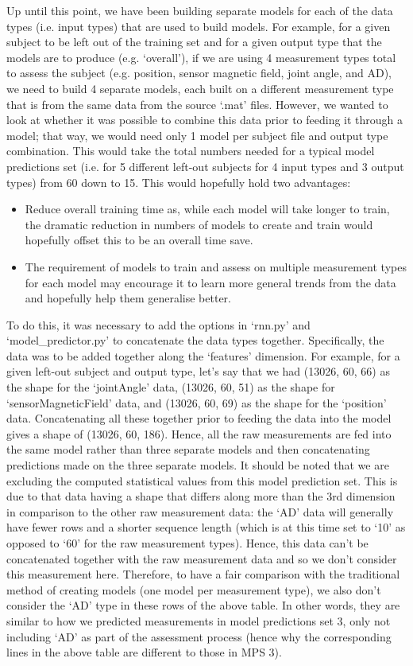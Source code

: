 \documentclass[12pt,twoside]{report}
\begin{document}
\quad Up until this point, we have been building separate models for each of the data types (i.e. input types) that are used to build models. For example, for a given subject to be left out of the training set and for a given output type that the models are to produce (e.g. ‘overall’), if we are using 4 measurement types total to assess the subject (e.g. position, sensor magnetic field, joint angle, and AD), we need to build 4 separate models, each built on a different measurement type that is from the same data from the source ‘.mat’ files. However, we wanted to look at whether it was possible to combine this data prior to feeding it through a model; that way, we would need only 1 model per subject file and output type combination. This would take the total numbers needed for a typical model predictions set (i.e. for 5 different left-out subjects for 4 input types and 3 output types) from 60 down to 15. This would hopefully hold two advantages:

\begin{itemize}
	\item Reduce overall training time as, while each model will take longer to train, the dramatic reduction in numbers of models to create and train would hopefully offset this to be an overall time save.
	\item The requirement of models to train and assess on multiple measurement types for each model may encourage it to learn more general trends from the data and hopefully help them generalise better.
\end{itemize}

\quad To do this, it was necessary to add the options in ‘rnn.py’ and ‘model\_predictor.py’ to concatenate the data types together. Specifically, the data was to be added together along the ‘features’ dimension. For example, for a given left-out subject and output type, let’s say that we had (13026, 60, 66) as the shape for the ‘jointAngle’ data, (13026, 60, 51) as the shape for ‘sensorMagneticField’ data, and (13026, 60, 69) as the shape for the ‘position’ data. Concatenating all these together prior to feeding the data into the model gives a shape of (13026, 60, 186). Hence, all the raw measurements are fed into the same model rather than three separate models and then concatenating predictions made on the three separate models. It should be noted that we are excluding the computed statistical values from this model prediction set. This is due to that data having a shape that differs along more than the 3rd dimension in comparison to the other raw measurement data: the ‘AD’ data will generally have fewer rows and a shorter sequence length (which is at this time set to ‘10’ as opposed to ‘60’ for the raw measurement types). Hence, this data can’t be concatenated together with the raw measurement data and so we don’t consider this measurement here. Therefore, to have a fair comparison with the traditional method of creating models (one model per measurement type), we also don’t consider the ‘AD’ type in these rows of the above table. In other words, they are similar to how we predicted measurements in model predictions set 3, only not including ‘AD’ as part of the assessment process (hence why the corresponding lines in the above table are different to those in MPS 3).
\end{document}
